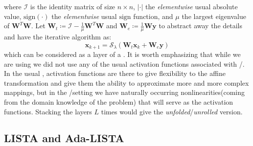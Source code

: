 where $\mathcal{I}$ is the identity matrix of size $n \times n$, $\left|\boldsymbol{\cdot}\right|$ the \emph{elementwise} usual absolute value, 
$\mathrm{sign}(\boldsymbol{\cdot})$ the \emph{elementwise} usual $\mathrm{sign}$ function, and $\mu$ the largest eigenvalue of $\boldsymbol{W}^T\boldsymbol{W}$. Let $\boldsymbol{W}_t \coloneqq \mathcal{I}-\frac{1}{\mu}\boldsymbol{W}^T\boldsymbol{W}$ and 
$\boldsymbol{W}_e \coloneqq \frac{1}{\mu}\boldsymbol{W}\boldsymbol{y}$ to abstract away the details  and have the iterative algorithm 
as:
\begin{equation*}
  \boldsymbol{x}_{k+1} = \mathcal{S}_\lambda\left(\boldsymbol{W}_t\boldsymbol{x}_{k}+\boldsymbol{W}_e\boldsymbol{y}\right)
\end{equation*}
which can be considered as a layer of a \nn{}. It is worth emphasizing that 
while we are using \nns we did not use any of the usual activation functions associated with \ml/\dl.
In the usual \nns, activation functions are there to give flexibility to the affine transformation 
and give them the ability to approximate more and more complex mappings, but in the \du/\au setting we have naturally occurring 
nonlinearities(coming from the domain knowledge of the problem) that will serve as the activation 
functions. Stacking the layers $L$ times would give the \emph{unfolded}/\emph{unrolled} version.

\subsection{LISTA and Ada-LISTA}

